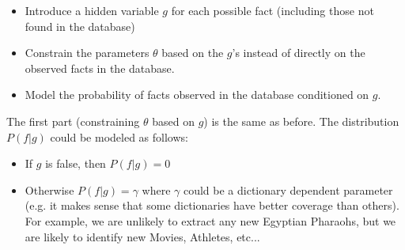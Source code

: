 \documentclass[12pt]{article}
\begin{document}
\begin{itemize}
  \item Introduce a hidden variable $g$ for each possible fact (including those not found in the database)
  \item Constrain the parameters $\theta$ based on the $g$'s instead of directly on the observed facts in the database.
  \item Model the probability of facts observed in the database conditioned on $g$.
\end{itemize}

The first part (constraining $\theta$ based on $g$) is the same as before.  The distribution $P(f|g)$ could be modeled as follows:
\begin{itemize}
  \item If $g$ is false, then $P(f|g) = 0$
  \item Otherwise $P(f|g) = \gamma$ where $\gamma$ could be a dictionary dependent parameter (e.g. it makes sense that some dictionaries have better coverage than others).
    For example, we are unlikely to extract any new Egyptian Pharaohs, but we are likely to identify new Movies, Athletes, etc...
\end{itemize}
\end{document}
